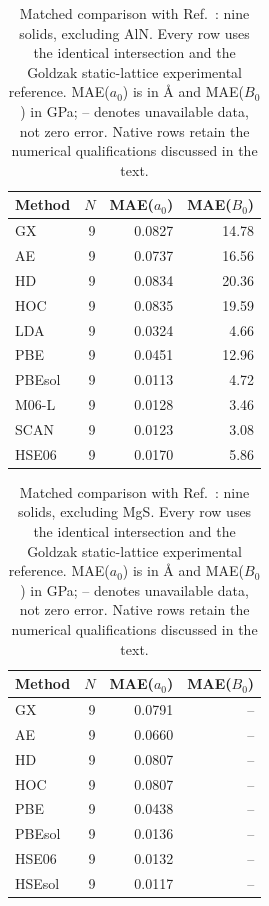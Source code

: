 \begin{table}[t]
\centering
\small
\caption{Matched comparison with Ref.~: nine solids, excluding AlN. Every row uses the identical intersection and the Goldzak static-lattice experimental reference. MAE($a_0$) is in \AA{} and MAE($B_0$) in GPa; -- denotes unavailable data, not zero error. Native rows retain the numerical qualifications discussed in the text.}
\label{tab:literature-Zhang2018}
\begin{tabular}{lrrr}
\toprule
Method & $N$ & MAE($a_0$) & MAE($B_0$) \\
\midrule
GX & 9 & 0.0827 & 14.78 \\
AE & 9 & 0.0737 & 16.56 \\
HD & 9 & 0.0834 & 20.36 \\
HOC & 9 & 0.0835 & 19.59 \\
LDA & 9 & 0.0324 & 4.66 \\
PBE & 9 & 0.0451 & 12.96 \\
PBEsol & 9 & 0.0113 & 4.72 \\
M06-L & 9 & 0.0128 & 3.46 \\
SCAN & 9 & 0.0123 & 3.08 \\
HSE06 & 9 & 0.0170 & 5.86 \\
\bottomrule
\end{tabular}
\end{table}

\begin{table}[t]
\centering
\small
\caption{Matched comparison with Ref.~: nine solids, excluding MgS. Every row uses the identical intersection and the Goldzak static-lattice experimental reference. MAE($a_0$) is in \AA{} and MAE($B_0$) in GPa; -- denotes unavailable data, not zero error. Native rows retain the numerical qualifications discussed in the text.}
\label{tab:literature-Schimka2011}
\begin{tabular}{lrrr}
\toprule
Method & $N$ & MAE($a_0$) & MAE($B_0$) \\
\midrule
GX & 9 & 0.0791 & -- \\
AE & 9 & 0.0660 & -- \\
HD & 9 & 0.0807 & -- \\
HOC & 9 & 0.0807 & -- \\
PBE & 9 & 0.0438 & -- \\
PBEsol & 9 & 0.0136 & -- \\
HSE06 & 9 & 0.0132 & -- \\
HSEsol & 9 & 0.0117 & -- \\
\bottomrule
\end{tabular}
\end{table}

